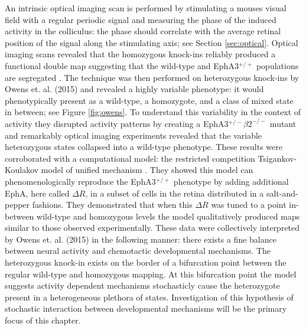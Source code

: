 An intrinsic optical imaging scan is performed by stimulating a mouses visual field with a regular periodic signal and measuring the phase of the induced activity in the colliculus: the phase should correlate with the average retinal position of the signal along the stimulating axis; see Section \ref{sec:optical}. Optical imaging scans revealed that the homozygous knock-ins reliably produced a functional double map suggesting that the wild-type and EphA3$^{+/+}$ populations are segregated \cite{Cang2008-ez}. The technique was then performed on heterozygous knock-ins by Owens et. al. (2015) and revealed a highly variable phenotype: it would phenotypically present as a wild-type, a homozygote, and a class of mixed state in between; see Figure \ref{fig:owens}. To understand this variability in the context of activity they disrupted activity patterns by creating a EphA3$^{+/-}\beta2^{-/-}$ mutant and remarkably optical imaging experiments revealed that the variable heterozygous states collapsed into a wild-type phenotype. These results were corroborated with a computational model: the restricted competition Tsigankov-Koulakov model of unified mechanism \cite{Tsigankov2006-uy}. They showed this model can phenomenologically reproduce the EphA3$^{+/+}$ phenotype by adding additional EphA, here called $\Delta R$, in a subset of cells in the retina distributed in a salt-and-pepper fashions. They demonstrated that when this $\Delta R$ was tuned to a point in-between wild-type and homozygous levels the model qualitatively produced maps similar to those observed experimentally. These data were collectively interpreted by Owens et. al. (2015) in the following manner: there exists a fine balance between neural activity and chemotactic developmental mechanisms. The heterozygous knock-in exists on the border of a bifurcation point between the regular wild-type and homozygous mapping. At this bifurcation point the model suggests activity dependent mechanisms stochasticly cause the heterozygote present in a heterogeneous plethora of states. Investigation of this hypothesis of stochastic interaction between developmental mechanisms will be the primary focus of this chapter.
